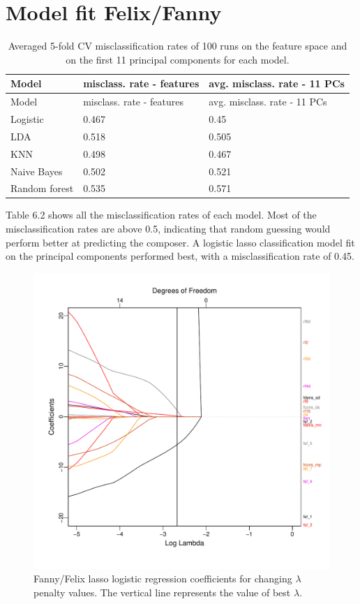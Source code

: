 \documentclass[12pt,twoside]{reedthesis}
\theoremstyle{definition}
\theoremstyle{definition}
\theoremstyle{definition}
\theoremstyle{remark}
\begin{document}
\section{Model fit Felix/Fanny}\label{model-fit-felixfanny}
\begin{longtable}[]{@{}lll@{}}
\caption{Averaged 5-fold CV misclassification rates of 100 runs on the
feature space and on the first 11 principal components for each
model.}\tabularnewline
\toprule
Model & misclass. rate - features & avg. misclass. rate - 11
PCs\tabularnewline
\midrule
\endfirsthead
\toprule
Model & misclass. rate - features & avg. misclass. rate - 11
PCs\tabularnewline
\midrule
\endhead
Logistic & 0.467 & 0.45\tabularnewline
LDA & 0.518 & 0.505\tabularnewline
KNN & 0.498 & 0.467\tabularnewline
Naive Bayes & 0.502 & 0.521\tabularnewline
Random forest & 0.535 & 0.571\tabularnewline
\bottomrule
\end{longtable}
Table 6.2 shows all the misclassification rates of each model. Most of
the misclassification rates are above 0.5, indicating that random
guessing would perform better at predicting the composer. A logistic
lasso classification model fit on the principal components performed
best, with a misclassification rate of 0.45.
\begin{figure}[H]
\centering
\includegraphics[scale = .6]{images/loglambda_f.pdf}
\caption{Fanny/Felix lasso logistic regression coefficients for changing $\lambda$ penalty values. The vertical line represents the value of best $\lambda$.}
\label{subd}
\end{figure}
\end{document}

